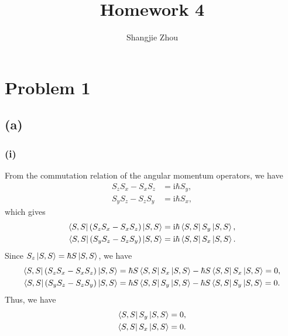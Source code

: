 \documentclass{article}
\title{Homework 4}
\author{Shangjie Zhou}
\newcommand{\ii}{\mathrm{i}}
\begin{document}
\maketitle


\section*{Problem 1}
\subsection*{(a)}
\subsubsection*{(i)}
From the commutation relation of the angular momentum operators, we have
\begin{subequations}
    \begin{align}
        S_z S_x-S_x S_z&=\ii \hbar S_y,\\
        S_y S_z-S_z S_y&=\ii \hbar S_x,
    \end{align}
\end{subequations}
which gives
\begin{subequations}
    \begin{align}
        \bra{S,S}(S_z S_x-S_x S_z)\ket{S,S}&=\ii \hbar \bra{S,S}S_y\ket{S,S},\\
        \bra{S,S}(S_y S_z-S_z S_y)\ket{S,S}&=\ii \hbar \bra{S,S}S_x\ket{S,S}.
    \end{align}
\end{subequations}
Since $S_z\ket{S,S}=\hbar S\ket{S,S}$, we have
\begin{subequations}
    \begin{align}
        \bra{S,S}(S_z S_x-S_x S_z)\ket{S,S}&=\hbar S \bra{S,S}S_x\ket{S,S}-\hbar S \bra{S,S}S_x\ket{S,S}=0,\\
        \bra{S,S}(S_y S_z-S_z S_y)\ket{S,S}&=\hbar S \bra{S,S}S_y\ket{S,S}-\hbar S \bra{S,S}S_y\ket{S,S}=0.
    \end{align}
    \end{subequations}
Thus, we have
\begin{subequations}
    \begin{align}
        \bra{S,S}S_y\ket{S,S}&=0,\\
        \bra{S,S}S_x\ket{S,S}&=0.
    \end{align}
\end{subequations}
\end{document}
